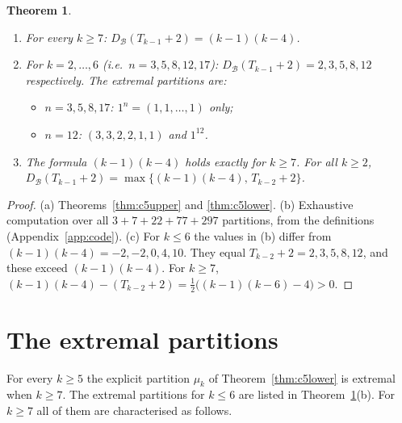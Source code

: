 \documentclass[11pt]{article}
\newtheorem{theorem}{Theorem}[section]
\theoremstyle{definition}
\newcommand{\DB}{D_{\mathcal{B}}}
\renewcommand{\le}{\leqslant}
\renewcommand{\ge}{\geqslant}
\begin{document}
\begin{theorem}\label{thm:c5main}
\begin{enumerate}
\item[(a)] For every $k\ge7$: $\DB(T_{k-1}+2)=(k-1)(k-4)$.
\item[(b)] For $k=2,\dots,6$ (i.e.\ $n=3,5,8,12,17$): $\DB(T_{k-1}+2)=2,3,5,8,12$ respectively.  The extremal
partitions are:
\begin{itemize}
\item $n=3,5,8,17$: $1^n=(1,1,\dots,1)$ only;
\item $n=12$: $(3,3,2,2,1,1)$ and $1^{12}$.
\end{itemize}
\item[(c)] The formula $(k-1)(k-4)$ holds exactly for $k\ge7$.  For all $k\ge2$,
$\DB(T_{k-1}+2)=\max\{(k-1)(k-4),\,T_{k-2}+2\}$.
\end{enumerate}
\end{theorem}
\begin{proof}
(a) Theorems~\ref{thm:c5upper} and \ref{thm:c5lower}.
(b) Exhaustive computation over all $3+7+22+77+297$ partitions, from the definitions (Appendix~\ref{app:code}).
(c) For $k\le6$ the values in (b) differ from $(k-1)(k-4)=-2,-2,0,4,10$.  They equal $T_{k-2}+2=2,3,5,8,12$, and
these exceed $(k-1)(k-4)$.  For $k\ge7$, $(k-1)(k-4)-(T_{k-2}+2)=\frac12\bigl((k-1)(k-6)-4\bigr)>0$.
\end{proof}

\section{The extremal partitions}\label{sec:c5ext}

For every $k\ge5$ the explicit partition $\mu_k$ of Theorem~\ref{thm:c5lower} is extremal when $k\ge7$.  The
extremal partitions for $k\le6$ are listed in Theorem~\ref{thm:c5main}(b).  For $k\ge7$ all of them are
characterised as follows.
\end{document}
